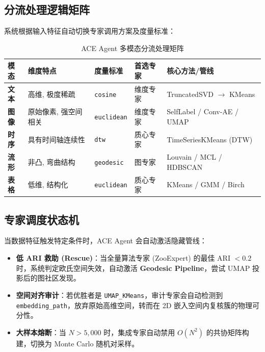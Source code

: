 \documentclass[12pt,a4paper]{article}
\begin{document}
\subsection{分流处理逻辑矩阵}

系统根据输入特征自动切换专家调用方案及度量标准：

\begin{table}[H]
\centering
\small
\begin{tabular}{@{}llllp{4cm}@{}}
\toprule
\textbf{模态} & \textbf{维度特点} & \textbf{度量标准} & \textbf{首选专家} & \textbf{核心方法/管线} \\
\midrule
\textbf{文本} & 高维, 极度稀疏 & \texttt{cosine} & 维度专家 & TruncatedSVD $\rightarrow$ KMeans \\
\textbf{图像} & 原始像素, 强空间相关 & \texttt{euclidean} & 维度专家 & SelfLabel / Conv-AE / UMAP \\
\textbf{时序} & 具有时间轴连续性 & \texttt{dtw} & 质心专家 & TimeSeriesKMeans (DTW) \\
\textbf{流形} & 非凸, 弯曲结构 & \texttt{geodesic} & 图专家 & Louvain / MCL / HDBSCAN \\
\textbf{表格} & 低维, 结构化 & \texttt{euclidean} & 质心专家 & KMeans / GMM / Birch \\
\bottomrule
\end{tabular}
\caption{ACE Agent 多模态分流处理矩阵}
\end{table}

\subsection{专家调度状态机}

当数据特征触发特定条件时，ACE Agent 会自动激活隐藏管线：

\begin{itemize}
    \item \textbf{低 ARI 救助 (Rescue)}：当全量算法专家 (ZooExpert) 的最佳 ARI $< 0.2$ 时，系统判定欧氏空间失效，自动激活 \textbf{Geodesic Pipeline}，尝试 UMAP 投影后的图社区发现。
    \item \textbf{空间对齐审计}：若优胜者是 \texttt{UMAP\_KMeans}，审计专家会自动检测到 \texttt{embedding\_path}，放弃原始高维空间，转而在 2D 嵌入空间内复核簇的物理可分性。
    \item \textbf{大样本熔断}：当 $N > 5,000$ 时，集成专家自动禁用 $O(N^2)$ 的共协矩阵构建，切换为 Monte Carlo 随机对采样。
\end{itemize}

\newpage
\end{document}
